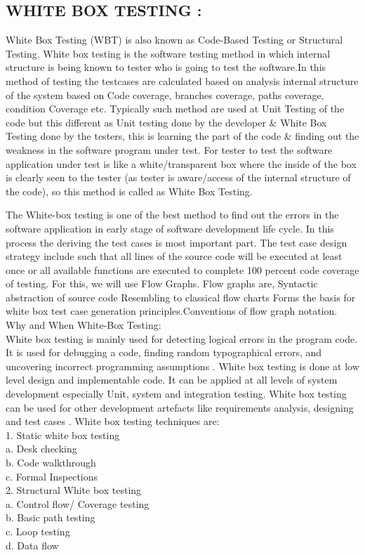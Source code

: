 \documentclass[a4paper,12pt]{article}
\begin{document}
\subsection{WHITE BOX TESTING :}
		 White Box Testing (WBT) is also known as Code-Based Testing or Structural Testing. White box testing is the software testing method in which internal structure is being known to tester who is going to test the software.In this method of testing the testcases are calculated based on analysis internal structure of the system based on Code coverage, branches coverage, paths coverage, condition Coverage etc. Typically such method are used at Unit Testing of the code but this different as Unit testing done by the developer \& White Box Testing done by the testers, this is learning the part of the code \& finding out the weakness in the software program under test.
For tester to test the software application under test is like a white/transparent box where the inside of the box is clearly seen to the tester (as tester is aware/access of the internal structure of the code), so this method is called as White Box Testing.

The White-box testing is one of the best method to find out the errors in the software application in early stage of software development life cycle. In this process the deriving the test cases is most important part. The test case design strategy include such that all lines of the source code will be executed at least once or all available functions are executed to complete 100 percent  code coverage of testing. For this, we will use Flow Graphs. Flow graphs are, Syntactic abstraction of source code Resembling to classical flow charts Forms the basis for white box test case generation principles.Conventions of flow graph notation. \\
Why and When White-Box Testing:\\
White box testing is mainly used for detecting logical errors in the program code. It is used for
debugging a code, finding random typographical errors, and uncovering incorrect programming
assumptions .
White box testing is done at low level design and implementable code. It can be applied at all levels of
system development especially Unit, system and integration testing. White box testing can be used for
other development artefacts like requirements analysis, designing and test cases .
White box testing techniques are:\\
1. Static white box testing\\
a. Desk checking\\
b. Code walkthrough\\
c. Formal Inspections\\
2. Structural White box testing\\
a. Control flow/ Coverage testing\\
b. Basic path testing\\
c. Loop testing\\
d. Data flow \\
\end{document}
